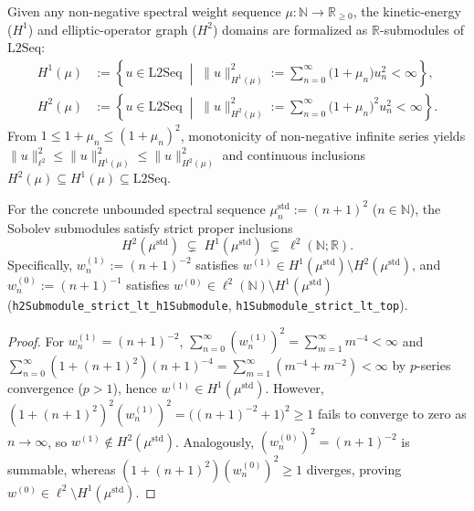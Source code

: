 Given any non-negative spectral weight sequence $\mu : \mathbb{N} \to \mathbb{R}_{\ge 0}$, the kinetic-energy ($H^1$) and elliptic-operator graph ($H^2$) domains are formalized as $\mathbb{R}$-submodules of $\mathrm{L2Seq}$:
\begin{align}
H^1(\mu) &:= \left\{ u \in \mathrm{L2Seq} \;\middle|\; \|u\|_{H^1(\mu)}^2 := \sum_{n=0}^\infty \bigl(1 + \mu_n\bigr) u_n^2 < \infty \right\}, \label{eq:H1_mu_def}\\
H^2(\mu) &:= \left\{ u \in \mathrm{L2Seq} \;\middle|\; \|u\|_{H^2(\mu)}^2 := \sum_{n=0}^\infty \bigl(1 + \mu_n\bigr)^2 u_n^2 < \infty \right\}. \label{eq:H2_mu_def}
\end{align}
From $1 \le 1 + \mu_n \le (1 + \mu_n)^2$, monotonicity of non-negative infinite series yields $\|u\|_{\ell^2}^2 \le \|u\|_{H^1(\mu)}^2 \le \|u\|_{H^2(\mu)}^2$ and continuous inclusions $H^2(\mu) \subseteq H^1(\mu) \subseteq \mathrm{L2Seq}$.

\begin{theorem}
\label{thm:sobolev_strict_nesting}
For the concrete unbounded spectral sequence $\mu_n^{\mathrm{std}} := (n + 1)^2$ ($n \in \mathbb{N}$), the Sobolev submodules satisfy strict proper inclusions
\begin{equation}
H^2(\mu^{\mathrm{std}}) \;\subsetneq\; H^1(\mu^{\mathrm{std}}) \;\subsetneq\; \ell^2(\mathbb{N}; \mathbb{R}).
\label{eq:strict_sobolev_chain}
\end{equation}
Specifically, $w^{(1)}_n := (n + 1)^{-2}$ satisfies $w^{(1)} \in H^1(\mu^{\mathrm{std}}) \setminus H^2(\mu^{\mathrm{std}})$, and $w^{(0)}_n := (n + 1)^{-1}$ satisfies $w^{(0)} \in \ell^2(\mathbb{N}) \setminus H^1(\mu^{\mathrm{std}})$ (\texttt{h2\allowbreak{}Submodule\_\allowbreak{}strict\_\allowbreak{}lt\_\allowbreak{}h1\allowbreak{}Submodule}, \texttt{h1\allowbreak{}Submodule\_\allowbreak{}strict\_\allowbreak{}lt\_\allowbreak{}top}).
\end{theorem}

\begin{proof}
For $w^{(1)}_n = (n+1)^{-2}$, $\sum_{n=0}^\infty (w^{(1)}_n)^2 = \sum_{m=1}^\infty m^{-4} < \infty$ and $\sum_{n=0}^\infty (1 + (n+1)^2)(n+1)^{-4} = \sum_{m=1}^\infty (m^{-4} + m^{-2}) < \infty$ by $p$-series convergence ($p > 1$), hence $w^{(1)} \in H^1(\mu^{\mathrm{std}})$. However, $(1 + (n+1)^2)^2 (w^{(1)}_n)^2 = \bigl((n+1)^{-2} + 1\bigr)^2 \ge 1$ fails to converge to zero as $n \to \infty$, so $w^{(1)} \notin H^2(\mu^{\mathrm{std}})$. Analogously, $(w^{(0)}_n)^2 = (n+1)^{-2}$ is summable, whereas $(1 + (n+1)^2)(w^{(0)}_n)^2 \ge 1$ diverges, proving $w^{(0)} \in \ell^2 \setminus H^1(\mu^{\mathrm{std}})$.
\end{proof}

